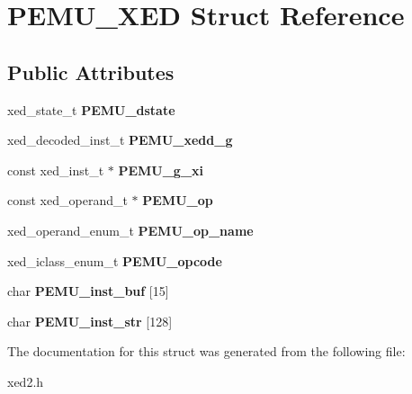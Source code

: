 \hypertarget{structPEMU__XED}{\section{\-P\-E\-M\-U\-\_\-\-X\-E\-D \-Struct \-Reference}
\label{structPEMU__XED}
}
\subsection*{\-Public \-Attributes}
\begin{DoxyCompactItemize}
\item 
\hypertarget{structPEMU__XED_a0f2da53704f59e1189059b8467a28e53}{xed\-\_\-state\-\_\-t {\bfseries \-P\-E\-M\-U\-\_\-dstate}}\label{structPEMU__XED_a0f2da53704f59e1189059b8467a28e53}

\item 
\hypertarget{structPEMU__XED_a26102772c0d2b0edf1b7f47b0fc368e9}{xed\-\_\-decoded\-\_\-inst\-\_\-t {\bfseries \-P\-E\-M\-U\-\_\-xedd\-\_\-g}}\label{structPEMU__XED_a26102772c0d2b0edf1b7f47b0fc368e9}

\item 
\hypertarget{structPEMU__XED_a4fbd8e0bd1626dcb111208d61f2b7d91}{const xed\-\_\-inst\-\_\-t $\ast$ {\bfseries \-P\-E\-M\-U\-\_\-g\-\_\-xi}}\label{structPEMU__XED_a4fbd8e0bd1626dcb111208d61f2b7d91}

\item 
\hypertarget{structPEMU__XED_a24890d4bb71ef5b9e9f0f9eae42d97bc}{const xed\-\_\-operand\-\_\-t $\ast$ {\bfseries \-P\-E\-M\-U\-\_\-op}}\label{structPEMU__XED_a24890d4bb71ef5b9e9f0f9eae42d97bc}

\item 
\hypertarget{structPEMU__XED_aa4fef85ac8fa270c1bbf90d78863d72b}{xed\-\_\-operand\-\_\-enum\-\_\-t {\bfseries \-P\-E\-M\-U\-\_\-op\-\_\-name}}\label{structPEMU__XED_aa4fef85ac8fa270c1bbf90d78863d72b}

\item 
\hypertarget{structPEMU__XED_a88e4d8151a3e7a36d202b9ea3cacd1e3}{xed\-\_\-iclass\-\_\-enum\-\_\-t {\bfseries \-P\-E\-M\-U\-\_\-opcode}}\label{structPEMU__XED_a88e4d8151a3e7a36d202b9ea3cacd1e3}

\item 
\hypertarget{structPEMU__XED_a7e8edec7e23dbc16f0c2aced5eab1488}{char {\bfseries \-P\-E\-M\-U\-\_\-inst\-\_\-buf} \mbox{[}15\mbox{]}}\label{structPEMU__XED_a7e8edec7e23dbc16f0c2aced5eab1488}

\item 
\hypertarget{structPEMU__XED_af73b3cd76f270e4558bfd79db45ddbdd}{char {\bfseries \-P\-E\-M\-U\-\_\-inst\-\_\-str} \mbox{[}128\mbox{]}}\label{structPEMU__XED_af73b3cd76f270e4558bfd79db45ddbdd}

\end{DoxyCompactItemize}


\-The documentation for this struct was generated from the following file\-:\begin{DoxyCompactItemize}
\item 
xed2.\-h\end{DoxyCompactItemize}
